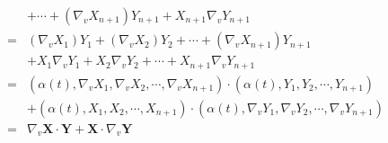 \begin{enumerate}
\begin{align*}
		& + \cdots + (\nabla_v X_{n+1})Y_{n+1} + X_{n+1}\nabla_v Y_{n+1}\\
		= & (\nabla_v X_1)Y_1 + (\nabla_v X_2)Y_2 + \cdots + (\nabla_v X_{n+1})Y_{n+1} \\
		& + X_1\nabla_v Y_1 +X_2\nabla_v Y_2 + \cdots + X_{n+1} \nabla_v Y_{n+1}\\
		= & (\alpha(t),\nabla_v X_1,\nabla_v X_2,\cdots,\nabla_v X_{n+1}) \cdot (\alpha(t),Y_1,Y_2,\cdots,Y_{n+1})\\
		& + (\alpha(t),X_1,X_2,\cdots,X_{n+1}) \cdot (\alpha(t),\nabla_v Y_1,\nabla_v Y_2,\cdots,\nabla_v Y_{n+1}) \\
		= & \nabla_v \mathbf{X} \cdot \mathbf{Y} + \mathbf{X} \cdot \nabla_v \mathbf{Y}
	\end{align*}
\end{enumerate}

